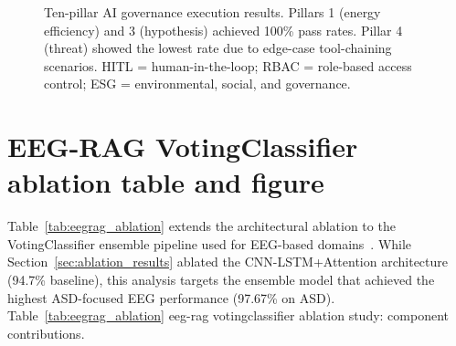 \begin{figure}[!htbp]
{%
}
\caption[10-Pillar AI Governance Execution Results]{Ten-pillar AI governance execution results. Pillars 1 (energy efficiency) and 3 (hypothesis) achieved 100\% pass rates. Pillar 4 (threat) showed the lowest rate due to edge-case tool-chaining scenarios. HITL = human-in-the-loop; RBAC = role-based access control; ESG = environmental, social, and governance.}
\label{fig:10pillar_results}
\end{figure}

\section{EEG-RAG VotingClassifier ablation table and figure}
\label{sec:appendix_ch4_s12}

Table~\ref{tab:eegrag_ablation} extends the architectural ablation to the VotingClassifier ensemble pipeline used for EEG-based domains~\cite{asthana2025eegmaster}. While Section~\ref{sec:ablation_results} ablated the CNN-LSTM+Attention architecture (94.7\% baseline), this analysis targets the ensemble model that achieved the highest ASD-focused EEG performance (97.67\% on ASD).
\noindent Table~\ref{tab:eegrag_ablation} eeg-rag votingclassifier ablation study: component contributions.

